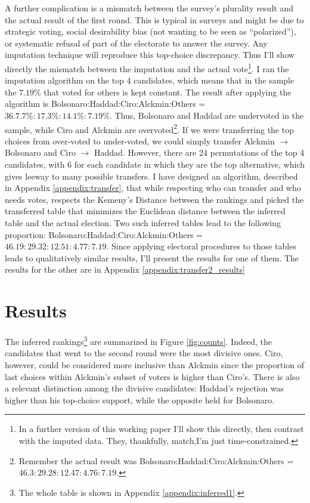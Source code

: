 \documentclass[hidelinks,11pt]{article}
\begin{document}
A further complication is a mismatch between the survey's
plurality result and the actual result of the first round. This is typical in
surveys and might be due to strategic voting, social desirability bias (not
wanting to be seen as ``polarized''), or systematic refusal of part of the electorate
to answer the survey. Any imputation technique will reproduce this top-choice discrepancy. Thus I'll show directly the mismatch between the
imputation and the actual vote\footnote{In a further version of this working
  paper I'll show this directly, then contrast with the imputed data. They,
  thankfully, match,I'm just time-constrained.}. I ran the imputation algorithm
on the top 4 candidates, which means that in the sample the \(7.19\%\) that
voted for others is kept constant. The result after applying the algorithm is
Bolsonaro:Haddad:Ciro:Alckmin:Others = \(36.7.7\% : 17.3\% : 14.1\% :7.19\% \).
Thus, Bolsonaro and Haddad are undervoted in the sample, while Ciro and Alckmin
are overvoted\footnote{Remember the actual result was
  Bolsonaro:Haddad:Ciro:Alckmin:Others = \(46.3:29.28:12.47:4.76:7.19 \).}. If
we were transferring the top choices from over-voted to under-voted, we
could simply transfer Alckmin \(\rightarrow\) Bolsonaro and Ciro \(\rightarrow\) Haddad.
However, there are 24 permutations of the top 4 candidates, with 6 for each
candidate in which they are the top alternative, which gives leeway to many
possible transfers. I have designed an algorithm, described in Appendix
\ref{appendix:transfer}, that while respecting who can transfer and who needs
votes, respects the Kemeny's Distance between the rankings and picked the
transferred table that minimizes the Euclidean distance between the inferred
table and the actual election. Two such inferred tables lead to the following
proportion: Bolsonaro:Haddad:Ciro:Alckmin:Others =
\(46.19:29.32:12.51:4.77:7.19 \). Since applying electoral procedures
to those tables leads to qualitatively similar results, I'll present the
results for one of them. The results for the other are in Appendix
\ref{appendix:transfer2_results}

\section{Results}
The inferred rankings\footnote{The whole table is shown in Appendix
  \ref{appendix:inferred1}.} are summarized in Figure \ref{fig:counts}. Indeed,
the candidates that went to the second round were the most divisive ones. Ciro,
however, could be considered more inclusive than Alckmin since the proportion
of last choices within Alckmin's subset of voters is higher than Ciro's. There
is also a relevant distinction among the divisive candidates: Haddad's rejection
was higher than his top-choice support, while the opposite held for Bolsonaro.
\end{document}
